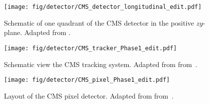 
\begin{figure*}[p]
  \vspace{-6mm}
  \centering
  \texttt{[image: fig/detector/CMS\_detector\_longitudinal\_edit.pdf]}
  \caption{
Schematic of one quadrant of the CMS detector in the positive $zy$-plane.
Adapted from \cite{CMS_eta}.
  } \label{fig:CMS_eta}
\end{figure*}

\begin{figure*}[p]
  \centering
  \texttt{[image: fig/detector/CMS\_tracker\_Phase1\_edit.pdf]}
  \caption{
Schematic view the CMS tracking system.
Adapted from from~\cite{CMS_tracker_sketch}.
  } \label{fig:CMS_tracker}
\end{figure*}

\begin{figure*}[p]
  \centering
  \texttt{[image: fig/detector/CMS\_pixel\_Phase1\_edit.pdf]}
  \vspace{-2mm}
  \caption{
Layout of the CMS pixel detector.
Adapted from from~\cite{CMS_pixel_Phase1_2021}.
  } \label{fig:CMS_pixel}
\end{figure*}
